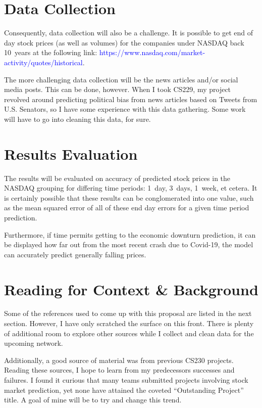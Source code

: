 \documentclass{article}
\begin{document}
\section*{Data Collection}
Consequently, data collection will also be a challenge. It is possible to get
end of day stock prices (as well as volumes) for the companies under NASDAQ back
10~years at the following link:
\textcolor{blue}{https://www.nasdaq.com/market-activity/quotes/historical}.

The more challenging data collection will be the news articles and/or social
media posts. This can be done, however. When I took CS229, my project revolved
around predicting political bias from news articles based on Tweets from U.S.
Senators, so I have some experience with this data gathering. Some work will have to go into cleaning
this data, for sure.

\section*{Results Evaluation}
The results will be evaluated on accuracy of predicted stock prices in the
NASDAQ grouping for differing time periods: 1~day, 3~days, 1~week, et cetera. It
is certainly possible that these results can be conglomerated into one value,
such as the mean squared error of all of these end day errors for a given time
period prediction.

Furthermore, if time permits getting to the economic downturn prediction, it can be
displayed how far out from the most recent crash due to Covid-19, the model can
accurately predict generally falling prices.

\section*{Reading for Context \& Background}
Some of the references used to come up with this proposal are listed in the next
section. However, I have only scratched the surface on this front. There is
plenty of additional room to explore other sources while I collect and clean
data for the upcoming network.

Additionally, a good source of material was from previous CS230 projects.
Reading these sources, I hope to learn from my predecessors successes and
failures. I found it curious that many teams submitted projects involving stock market
prediction, yet none have attained the coveted ``Outstanding Project'' title. A
goal of mine will be to try and change this trend.
\end{document}
